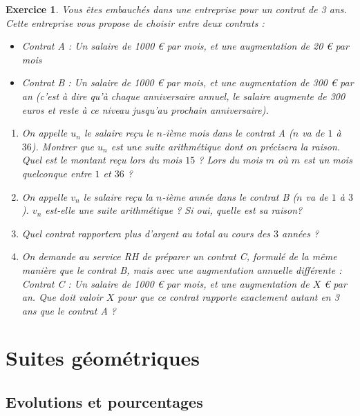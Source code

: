 \documentclass[10pt,a4paper]{article}
\newtheorem{exo}{Exercice}
\begin{document}
\begin{exo}
    Vous êtes embauchés dans une entreprise pour un contrat de 3 ans. Cette entreprise vous propose de choisir entre deux contrats :
    \begin{itemize}
        \item Contrat A : Un salaire de 1000 € par mois, et une augmentation de 20 € par mois
        \item Contrat B : Un salaire de 1000 € par mois, et une augmentation de 300 € par an (c'est à dire qu'à chaque anniversaire annuel, le salaire augmente de 300 euros et reste à ce niveau jusqu'au prochain anniversaire).
    \end{itemize}
    
    \begin{enumerate}
        \item On appelle $u_n$ le salaire reçu le $n$-ième mois dans le contrat A  ($n$ va de $1$ à $36$). Montrer que $u_n$ est une suite arithmétique dont on précisera la raison. Quel est le montant reçu lors du mois $15$ ? Lors du mois $m$ où $m$ est un mois quelconque entre $1$ et $36$ ?
        \item On appelle $v_n$ le salaire reçu la $n$-ième année dans le contrat B  ($n$ va de $1$ à $3$). $v_n$ est-elle une suite arithmétique ? Si oui, quelle est sa raison?
        \item Quel contrat rapportera plus d'argent au total au cours des $3$ années ? 
        \item On demande au service RH de préparer un contrat C, formulé de la même manière que le contrat B, mais avec une augmentation annuelle différente : Contrat C : Un salaire de 1000 € par mois, et une augmentation de $X$ € par an.  Que doit valoir $X$ pour que ce contrat rapporte exactement autant en 3 ans que le contrat A ? 
        
    \end{enumerate}
\end{exo}


\newpage

\setcounter{exo}{20}
\section{Suites géométriques}


\subsection{Evolutions et pourcentages}
\end{document}
